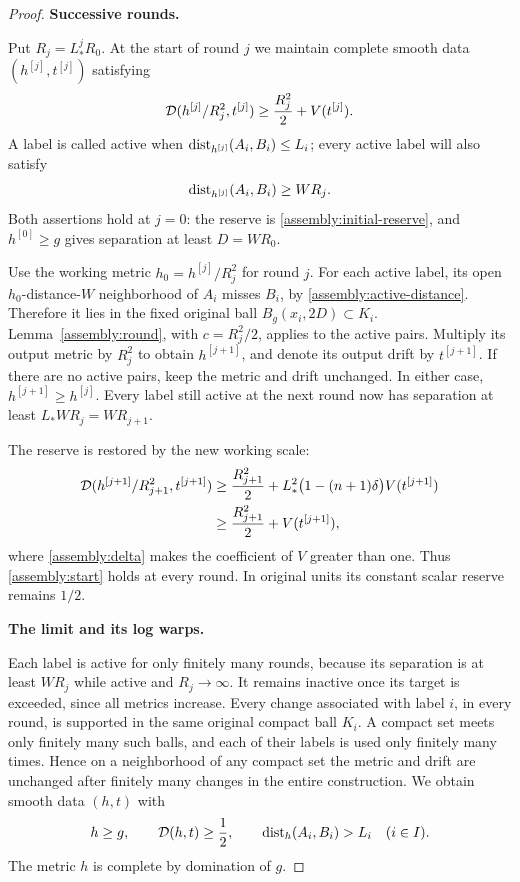 \begin{proof}
\medskip\noindent\textbf{Successive rounds.}

Put $R_j=L_*^jR_0$.  At the start of round $j$ we maintain complete
smooth data $(h^{[j]},t^{[j]})$ satisfying
\begin{equation}\label{assembly:start}
 \mathcal D(h^{[j]}/R_j^2,t^{[j]})
       \ge\frac{R_j^2}{2}+V(t^{[j]}).
\end{equation}
A label is called active when
$\operatorname{dist}_{h^{[j]}}(A_i,B_i)\le L_i$; every active label will also satisfy
\begin{equation}\label{assembly:active-distance}
 \operatorname{dist}_{h^{[j]}}(A_i,B_i)\ge WR_j.
\end{equation}
Both assertions hold at $j=0$: the reserve is
\eqref{assembly:initial-reserve}, and $h^{[0]}\ge g$ gives separation
at least $D=WR_0$.

Use the working metric $h_0=h^{[j]}/R_j^2$ for round $j$.
For each active label, its open $h_0$-distance-$W$ neighborhood of
$A_i$ misses $B_i$, by \eqref{assembly:active-distance}.  Therefore
it lies in the fixed original ball $B_g(x_i,2D)\subset K_i$.
Lemma~\ref{assembly:round}, with $c=R_j^2/2$, applies to the active
pairs.  Multiply its output metric by $R_j^2$ to obtain $h^{[j+1]}$,
and denote its output drift by $t^{[j+1]}$.  If there are no active
pairs, keep the metric and drift unchanged.  In either case,
$h^{[j+1]}\ge h^{[j]}$.  Every label still active at the next round
now has separation at least $L_*WR_j=WR_{j+1}$.

The reserve is restored by the new working scale:
\begin{align*}
 \mathcal D(h^{[j+1]}/R_{j+1}^2,t^{[j+1]})
 &\ge\frac{R_{j+1}^2}{2}
       +L_*^2\bigl(1-(n+1)\delta\bigr)V(t^{[j+1]})\\
 &\ge\frac{R_{j+1}^2}{2}+V(t^{[j+1]}),
\end{align*}
where \eqref{assembly:delta} makes the coefficient of $V$ greater
than one.  Thus \eqref{assembly:start} holds at every round.  In
original units its constant scalar reserve remains $1/2$.

\medskip\noindent\textbf{The limit and its log warps.}

Each label is active for only finitely many rounds, because its
separation is at least $WR_j$ while active and $R_j\to\infty$.
It remains inactive once its target is exceeded, since all metrics
increase.  Every change associated with label $i$, in every round,
is supported in the same original compact ball $K_i$.  A compact
set meets only finitely many such balls, and each of their labels
is used only finitely many times.  Hence on a neighborhood of any
compact set the metric and drift are unchanged after finitely many
changes in the entire construction.  We obtain smooth data $(h,t)$
with
\begin{equation}\label{assembly:final-drift}
 h\ge g,\qquad \mathcal D(h,t)\ge\frac12,
 \qquad \operatorname{dist}_h(A_i,B_i)>L_i\quad(i\in I).
\end{equation}
The metric $h$ is complete by domination of $g$.


\end{proof}
